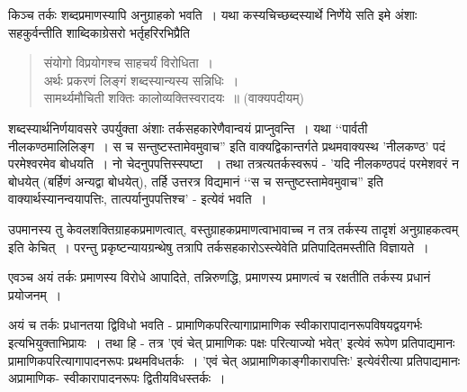 {किञ्च तर्कः शब्दप्रमाणस्यापि अनुग्राहको भवति~। यथा कस्यचिच्छब्दस्यार्थे निर्णेये सति इमे अंशाः सहकुर्वन्तीति शाब्दिकाग्रेसरो भर्तृहरिरभिप्रैति 
\begin{verse}
संयोगो विप्रयोगश्च साहचर्यं विरोधिता~। \\
अर्थः प्रकरणं लिङ्गं शब्दस्यान्यस्य सन्निधिः~। \\
सामर्थ्यमौचिती शक्तिः कालोव्यक्तिस्वरादयः~॥ (वाक्यपदीयम्)
\end{verse}
शब्दस्यार्थनिर्णयावसरे उपर्युक्ता अंशाः तर्कसहकारेणैवान्वयं प्राप्नुवन्ति~। यथा ‘‘पार्वती नीलकण्ठमालिलिङ्ग~। स च सन्तुष्टस्तामेवमुवाच'' इति वाक्यद्विकान्तर्गते प्रथमवाक्यस्थ 'नीलकण्ठ' पदं परमेश्वरमेव बोधयति~। नो चेदनुपपत्तिस्स्पष्टा ~। तथा तत्रत्यतर्कस्वरूपं - 'यदि नीलकण्ठपदं परमेशवरं न बोधयेत् (बर्हिणं अन्यद्वा बोधयेत्), तर्हि उत्तरत्र विद्यमानं ‘‘स च सन्तुष्टस्तामेवमुवाच'' इति वाक्यार्थस्यानन्वयापत्तिः, तात्पर्यानुपपत्तिश्च' - इत्येवं भवति~। 

उपमानस्य तु केवलशक्तिग्राहकप्रमाणत्वात्, वस्तुग्राहकप्रमाणत्वाभावाच्च न तत्र तर्कस्य तादृशं अनुग्राहकत्वम् इति केचित्~। परन्तु प्रकृष्टन्यायग्रन्थेषु तत्रापि तर्कसहकारोऽस्त्येवेति प्रतिपादितमस्तीति विज्ञायते~। 

एवञ्च अयं तर्कः प्रमाणस्य विरोधे आपादिते, तन्निरुणद्धि, प्रमाणस्य प्रमाणत्वं च रक्षतीति तर्कस्य प्रधानं प्रयोजनम्~। 

अयं च तर्कः प्रधानतया द्विविधो भवति - प्रामाणिकपरित्यागाप्रामाणिक स्वीकारा\-पादानरूपविषयद्वयगर्भः इत्यभियुक्ताभिप्रायः~। तथा हि - तत्र 'एवं चेत् प्रामाणिकः पक्षः परित्याज्यो भवेत्' इत्येवं रूपेण प्रतिपाद्यमानः प्रामाणिकपरित्यागापादनरूपः प्रथमविधतर्कः~। 'एवं चेत् अप्रामाणिकाङ्गीकारापत्तिः' इत्येवंरीत्या प्रतिपाद्यमानः अप्रामाणिक- स्वीकारापादनरूपः द्वितीयविधस्तर्कः~। 

}
